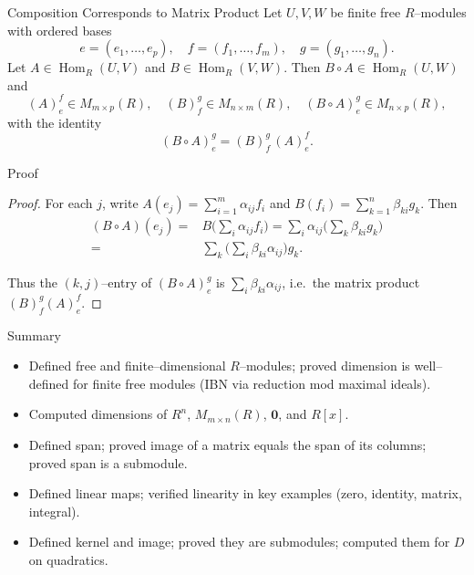 \documentclass[11pt,aspectratio=43,ignorenonframetext,t]{beamer}
\newcounter{example_number} %
\begin{document}
\begin{frame}{Composition Corresponds to Matrix Product}
Let $U,V,W$ be finite free $R$–modules with ordered bases
\[
e=(e_1,\dots,e_p),\quad f=(f_1,\dots,f_m),\quad g=(g_1,\dots,g_n).
\]
Let $A\in\operatorname{Hom}_R(U,V)$ and $B\in\operatorname{Hom}_R(V,W)$. Then $B\circ A\in\operatorname{Hom}_R(U,W)$ and
\[
(A)_e^f\in M_{m\times p}(R),\quad (B)_f^g\in M_{n\times m}(R),\quad (B\circ A)_e^g\in M_{n\times p}(R),
\]
with the identity
\[
(B\circ A)_e^g=(B)_f^g\,(A)_e^f.
\]
\begin{center}
\end{center}

\end{frame}

\begin{frame}{Proof}
    \begin{proof}
For each $j$, write $A(e_j)=\sum_{i=1}^m \alpha_{ij} f_i$ and $B(f_i)=\sum_{k=1}^n \beta_{ki} g_k$.
Then
\begin{align*}
    (B\circ A)(e_j)=&B\Big(\sum_i \alpha_{ij} f_i\Big)=\sum_i \alpha_{ij} \Big(\sum_k \beta_{ki} g_k\Big)\\
=&\sum_k \Big(\sum_i \beta_{ki}\alpha_{ij}\Big) g_k.
\end{align*}

Thus the $(k,j)$–entry of $(B\circ A)_e^g$ is $\sum_i \beta_{ki}\alpha_{ij}$, i.e.\ the matrix product $(B)_f^g (A)_e^f$.
\end{proof}
\end{frame}

\begin{frame}{Summary}
\begin{itemize}
  \item Defined free and finite–dimensional $R$–modules; proved dimension is well–defined for finite free modules (IBN via reduction mod maximal ideals).
  \item Computed dimensions of $R^n$, $M_{m\times n}(R)$, $\mathbf{0}$, and $R[x]$.
  \item Defined span; proved image of a matrix equals the span of its columns; proved span is a submodule.
  \item Defined linear maps; verified linearity in key examples (zero, identity, matrix, integral).
  \item Defined kernel and image; proved they are submodules; computed them for $D$ on quadratics.
\end{itemize}
\end{frame}
\end{document}
